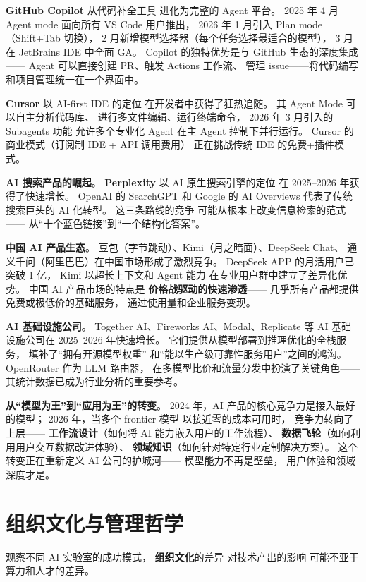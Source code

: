 \textbf{GitHub Copilot} 从代码补全工具
进化为完整的 Agent 平台。
2025 年 4 月 Agent mode 面向所有 VS Code 用户推出，
2026 年 1 月引入 Plan mode（Shift+Tab 切换），
2 月新增模型选择器（每个任务选择最适合的模型），
3 月在 JetBrains IDE 中全面 GA。
Copilot 的独特优势是与 GitHub 生态的深度集成——
Agent 可以直接创建 PR、触发 Actions 工作流、
管理 issue——将代码编写和项目管理统一在一个界面中。

\textbf{Cursor} 以 AI-first IDE 的定位
在开发者中获得了狂热追随。
其 Agent Mode 可以自主分析代码库、
进行多文件编辑、运行终端命令，
2026 年 3 月引入的 Subagents 功能
允许多个专业化 Agent 在主 Agent 控制下并行运行。
Cursor 的商业模式（订阅制 IDE + API 调用费用）
正在挑战传统 IDE 的免费+插件模式。

\textbf{AI 搜索产品的崛起}。
\textbf{Perplexity} 以 AI 原生搜索引擎的定位
在 2025--2026 年获得了快速增长。
OpenAI 的 SearchGPT 和 Google 的 AI Overviews
代表了传统搜索巨头的 AI 化转型。
这三条路线的竞争
可能从根本上改变信息检索的范式——
从``十个蓝色链接''到``一个结构化答案''。

\textbf{中国 AI 产品生态}。
豆包（字节跳动）、Kimi（月之暗面）、DeepSeek Chat、
通义千问（阿里巴巴）在中国市场形成了激烈竞争。
DeepSeek APP 的月活用户已突破 1 亿，
Kimi 以超长上下文和 Agent 能力
在专业用户群中建立了差异化优势。
中国 AI 产品市场的特点是
\textbf{价格战驱动的快速渗透}——
几乎所有产品都提供免费或极低价的基础服务，
通过使用量和企业服务变现。

\textbf{AI 基础设施公司}。
Together AI、Fireworks AI、Modal、Replicate 等
AI 基础设施公司在 2025--2026 年快速增长。
它们提供从模型部署到推理优化的全栈服务，
填补了``拥有开源模型权重''
和``能以生产级可靠性服务用户''之间的鸿沟。
OpenRouter 作为 LLM 路由器，
在多模型比价和流量分发中扮演了关键角色——
其统计数据已成为行业分析的重要参考。

\textbf{从``模型为王''到``应用为王''的转变}。
2024 年，AI 产品的核心竞争力是接入最好的模型；
2026 年，当多个 frontier 模型
以接近零的成本可用时，
竞争力转向了上层——
\textbf{工作流设计}（如何将 AI 能力嵌入用户的工作流程）、
\textbf{数据飞轮}（如何利用用户交互数据改进体验）、
\textbf{领域知识}（如何针对特定行业定制解决方案）。
这个转变正在重新定义 AI 公司的护城河——
模型能力不再是壁垒，
用户体验和领域深度才是。

\section{组织文化与管理哲学}
\label{sec:org-culture}

观察不同 AI 实验室的成功模式，
\textbf{组织文化}的差异
对技术产出的影响
可能不亚于算力和人才的差异。

